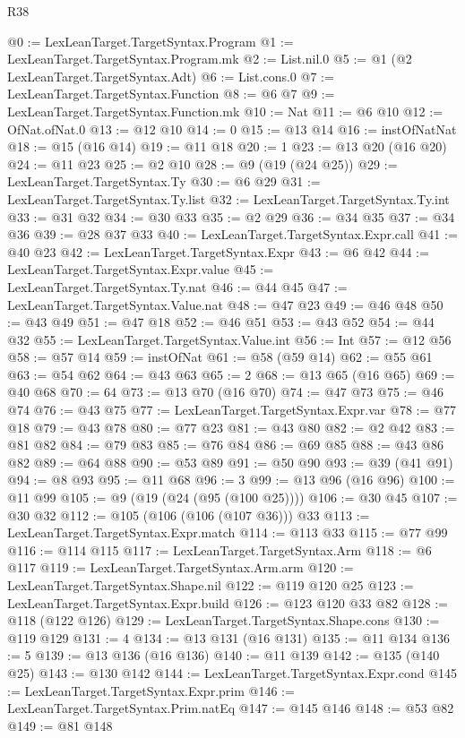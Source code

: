 \begin{lexlean}{R38}
\begin{coremodule}
@0 := LexLeanTarget.TargetSyntax.Program
@1 := LexLeanTarget.TargetSyntax.Program.mk
@2 := List.nil.{0}
@5 := @1 (@2 LexLeanTarget.TargetSyntax.Adt)
@6 := List.cons.{0}
@7 := LexLeanTarget.TargetSyntax.Function
@8 := @6 @7
@9 := LexLeanTarget.TargetSyntax.Function.mk
@10 := Nat
@11 := @6 @10
@12 := OfNat.ofNat.{0}
@13 := @12 @10
@14 := 0
@15 := @13 @14
@16 := instOfNatNat
@18 := @15 (@16 @14)
@19 := @11 @18
@20 := 1
@23 := @13 @20 (@16 @20)
@24 := @11 @23
@25 := @2 @10
@28 := @9 (@19 (@24 @25))
@29 := LexLeanTarget.TargetSyntax.Ty
@30 := @6 @29
@31 := LexLeanTarget.TargetSyntax.Ty.list
@32 := LexLeanTarget.TargetSyntax.Ty.int
@33 := @31 @32
@34 := @30 @33
@35 := @2 @29
@36 := @34 @35
@37 := @34 @36
@39 := @28 @37 @33
@40 := LexLeanTarget.TargetSyntax.Expr.call
@41 := @40 @23
@42 := LexLeanTarget.TargetSyntax.Expr
@43 := @6 @42
@44 := LexLeanTarget.TargetSyntax.Expr.value
@45 := LexLeanTarget.TargetSyntax.Ty.nat
@46 := @44 @45
@47 := LexLeanTarget.TargetSyntax.Value.nat
@48 := @47 @23
@49 := @46 @48
@50 := @43 @49
@51 := @47 @18
@52 := @46 @51
@53 := @43 @52
@54 := @44 @32
@55 := LexLeanTarget.TargetSyntax.Value.int
@56 := Int
@57 := @12 @56
@58 := @57 @14
@59 := instOfNat
@61 := @58 (@59 @14)
@62 := @55 @61
@63 := @54 @62
@64 := @43 @63
@65 := 2
@68 := @13 @65 (@16 @65)
@69 := @40 @68
@70 := 64
@73 := @13 @70 (@16 @70)
@74 := @47 @73
@75 := @46 @74
@76 := @43 @75
@77 := LexLeanTarget.TargetSyntax.Expr.var
@78 := @77 @18
@79 := @43 @78
@80 := @77 @23
@81 := @43 @80
@82 := @2 @42
@83 := @81 @82
@84 := @79 @83
@85 := @76 @84
@86 := @69 @85
@88 := @43 @86 @82
@89 := @64 @88
@90 := @53 @89
@91 := @50 @90
@93 := @39 (@41 @91)
@94 := @8 @93
@95 := @11 @68
@96 := 3
@99 := @13 @96 (@16 @96)
@100 := @11 @99
@105 := @9 (@19 (@24 (@95 (@100 @25))))
@106 := @30 @45
@107 := @30 @32
@112 := @105 (@106 (@106 (@107 @36))) @33
@113 := LexLeanTarget.TargetSyntax.Expr.match
@114 := @113 @33
@115 := @77 @99
@116 := @114 @115
@117 := LexLeanTarget.TargetSyntax.Arm
@118 := @6 @117
@119 := LexLeanTarget.TargetSyntax.Arm.arm
@120 := LexLeanTarget.TargetSyntax.Shape.nil
@122 := @119 @120 @25
@123 := LexLeanTarget.TargetSyntax.Expr.build
@126 := @123 @120 @33 @82
@128 := @118 (@122 @126)
@129 := LexLeanTarget.TargetSyntax.Shape.cons
@130 := @119 @129
@131 := 4
@134 := @13 @131 (@16 @131)
@135 := @11 @134
@136 := 5
@139 := @13 @136 (@16 @136)
@140 := @11 @139
@142 := @135 (@140 @25)
@143 := @130 @142
@144 := LexLeanTarget.TargetSyntax.Expr.cond
@145 := LexLeanTarget.TargetSyntax.Expr.prim
@146 := LexLeanTarget.TargetSyntax.Prim.natEq
@147 := @145 @146
@148 := @53 @82
@149 := @81 @148

\end{coremodule}
\end{lexlean}
